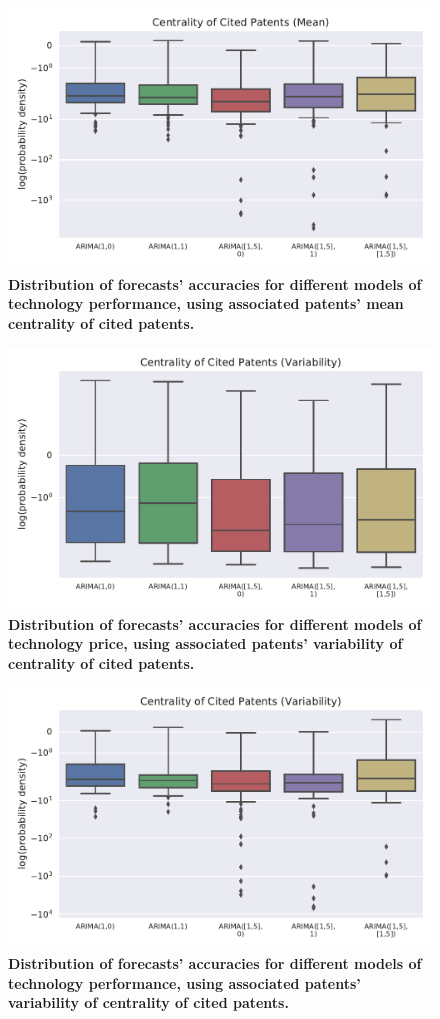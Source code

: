 \documentclass{article}
\begin{document}
\begin{figure}
    \centering
    \includegraphics[width=.75\textwidth]{figs/VAR_Model_Prediction_meanSPNPcited_1year_before_Performance.pdf}
    \caption{\textbf{Distribution of forecasts' accuracies for different models of technology performance, using associated patents' mean centrality of cited patents.}}
    \label{VAR_Model_Prediction_meanSPNPcited_1year_before_Performance}
\end{figure}

\begin{figure}
    \centering
    \includegraphics[width=.75\textwidth]{figs/VAR_Model_Prediction_stdSPNPcited_1year_before_Price.pdf}
    \caption{\textbf{Distribution of forecasts' accuracies for different models of technology price, using associated patents' variability of centrality of cited patents.}}
    \label{VAR_Model_Prediction_stdSPNPcited_1year_before_Price}
\end{figure}

\begin{figure}
    \centering
    \includegraphics[width=.75\textwidth]{figs/VAR_Model_Prediction_stdSPNPcited_1year_before_Performance.pdf}
    \caption{\textbf{Distribution of forecasts' accuracies for different models of technology performance, using associated patents' variability of centrality of cited patents.}}
    \label{VAR_Model_Prediction_stdSPNPcited_1year_before_Performance}
\end{figure}
\end{document}
